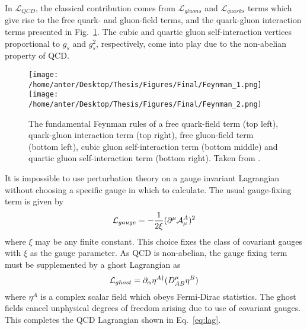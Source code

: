 In $\mathcal{L}_{QCD}$, the classical contribution comes from $\mathcal{L}_{gluons}$ and $\mathcal{L}_{quarks}$ terms which give rise to the free quark- and gluon-field terms, and the quark-gluon interaction terms presented in Fig.~\ref{fig:feyn}. The cubic and quartic gluon self-interaction vertices proportional to $g_s$ and $g^2_s$, respectively, come into play due to the non-abelian property of QCD.

\begin{figure}[!h]
\begin{center}
\texttt{[image: /home/anter/Desktop/Thesis/Figures/Final/Feynman\_1.png]}\\
\vspace*{10mm}
\texttt{[image: /home/anter/Desktop/Thesis/Figures/Final/Feynman\_2.png]}
\vspace*{4mm}
\caption[The fundamental Feynman rules for different processes of quantum chromodynamics.]{The fundamental Feynman rules of a free quark-field term (top left), quark-gluon interaction term (top right), free gluon-field term (bottom left), cubic gluon self-interaction term (bottom middle) and quartic gluon self-interaction term (bottom right). Taken from \cite{Rabbertz:2017ssq}.}
\label{fig:feyn}
\end{center}
\end{figure}

It is impossible to use perturbation theory on a gauge invariant Lagrangian without choosing a specific gauge in which to calculate. The usual gauge-fixing term is given by 
\begin{equation}
{\cal L}_{gauge}=-\frac{1}{2\xi} (\partial^{\mu}{\cal A}^{A}_{\mu})^{2}
\label{eq:gauge-fixing}
\end{equation}
where $\xi$ may be any finite constant. This choice fixes the class of covariant gauges with $\xi$ as the gauge parameter. As QCD is non-abelian, the gauge fixing term must be supplemented by a ghost Lagrangian as
\begin{equation}
{\cal L}_{ghost}=\partial_{\alpha}\eta^{A\dagger}(D^{\mu}_{AB}\eta^{B})
\label{eq:ghost}
\end{equation}
where $\eta^{A}$ is a complex scalar field which obeys Fermi-Dirac statistics. The ghost fields cancel unphysical degrees of freedom arising due to use of covariant gauges. This completes the QCD Lagrangian shown in Eq.~\ref{eq:lag}.

